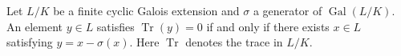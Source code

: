 \documentclass[12pt]{article}
\begin{document}
Let $L/K$ be a finite cyclic Galois extension and $\sigma$ a generator of $\operatorname{Gal}(L/K)$. An element $y\in L$ satisfies $\operatorname{Tr}(y)=0$ if and only if there exists $x\in L$ satisfying $y=x-\sigma(x)$. Here $\operatorname{Tr}$ denotes the trace in $L/K$.
\end{document}
